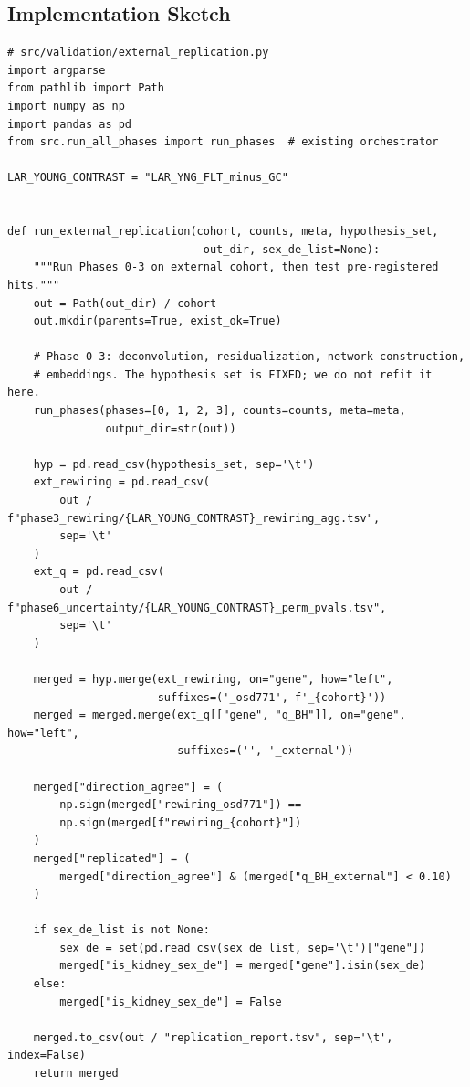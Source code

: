 \documentclass[11pt]{article}
\begin{document}
\subsection{Implementation Sketch}

\begin{lstlisting}[style=pythonstyle,caption={External-replication driver for OSD-102 (primary) and OSD-513 (sex-stratification).}]
# src/validation/external_replication.py
import argparse
from pathlib import Path
import numpy as np
import pandas as pd
from src.run_all_phases import run_phases  # existing orchestrator

LAR_YOUNG_CONTRAST = "LAR_YNG_FLT_minus_GC"


def run_external_replication(cohort, counts, meta, hypothesis_set,
                              out_dir, sex_de_list=None):
    """Run Phases 0-3 on external cohort, then test pre-registered hits."""
    out = Path(out_dir) / cohort
    out.mkdir(parents=True, exist_ok=True)

    # Phase 0-3: deconvolution, residualization, network construction,
    # embeddings. The hypothesis set is FIXED; we do not refit it here.
    run_phases(phases=[0, 1, 2, 3], counts=counts, meta=meta,
               output_dir=str(out))

    hyp = pd.read_csv(hypothesis_set, sep='\t')
    ext_rewiring = pd.read_csv(
        out / f"phase3_rewiring/{LAR_YOUNG_CONTRAST}_rewiring_agg.tsv",
        sep='\t'
    )
    ext_q = pd.read_csv(
        out / f"phase6_uncertainty/{LAR_YOUNG_CONTRAST}_perm_pvals.tsv",
        sep='\t'
    )

    merged = hyp.merge(ext_rewiring, on="gene", how="left",
                       suffixes=('_osd771', f'_{cohort}'))
    merged = merged.merge(ext_q[["gene", "q_BH"]], on="gene", how="left",
                          suffixes=('', '_external'))

    merged["direction_agree"] = (
        np.sign(merged["rewiring_osd771"]) ==
        np.sign(merged[f"rewiring_{cohort}"])
    )
    merged["replicated"] = (
        merged["direction_agree"] & (merged["q_BH_external"] < 0.10)
    )

    if sex_de_list is not None:
        sex_de = set(pd.read_csv(sex_de_list, sep='\t')["gene"])
        merged["is_kidney_sex_de"] = merged["gene"].isin(sex_de)
    else:
        merged["is_kidney_sex_de"] = False

    merged.to_csv(out / "replication_report.tsv", sep='\t', index=False)
    return merged



\end{lstlisting}
\end{document}
